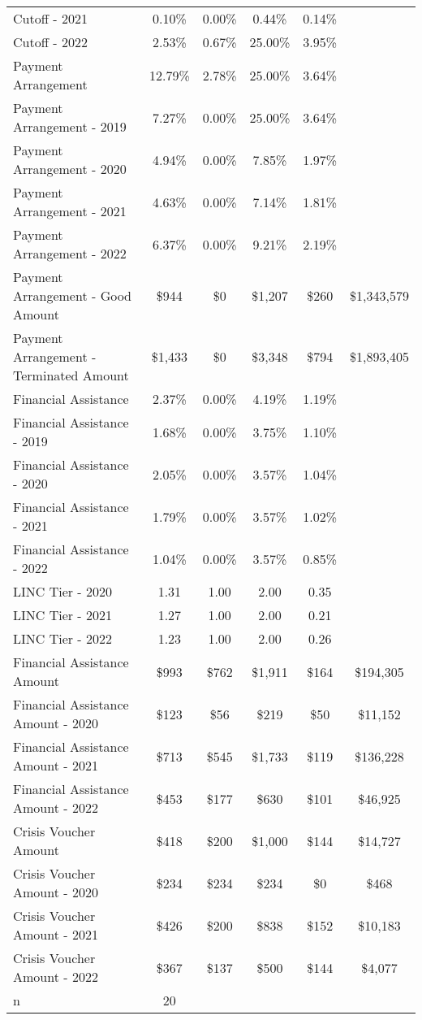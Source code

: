 \begin{tabular}{l|c|c|c|c|c}
\quad Cutoff - 2021 & 0.10\% & 0.00\% & 0.44\% & 0.14\% \\
\quad Cutoff - 2022 & 2.53\% & 0.67\% & 25.00\% & 3.95\% \\
\midrule 
Payment Arrangement & 12.79\% & 2.78\% & 25.00\% & 3.64\% \\
\quad Payment Arrangement - 2019 & 7.27\% & 0.00\% & 25.00\% & 3.64\% \\
\quad Payment Arrangement - 2020 & 4.94\% & 0.00\% & 7.85\% & 1.97\% \\
\quad Payment Arrangement - 2021 & 4.63\% & 0.00\% & 7.14\% & 1.81\% \\
\quad Payment Arrangement - 2022 & 6.37\% & 0.00\% & 9.21\% & 2.19\% \\
\quad Payment Arrangement - Good Amount & \$944 & \$0 & \$1,207 & \$260 & \$1,343,579 \\
\quad Payment Arrangement - Terminated Amount & \$1,433 & \$0 & \$3,348 & \$794 & \$1,893,405 \\
\midrule 
Financial Assistance & 2.37\% & 0.00\% & 4.19\% & 1.19\% \\
\quad Financial Assistance - 2019 & 1.68\% & 0.00\% & 3.75\% & 1.10\% \\
\quad Financial Assistance - 2020 & 2.05\% & 0.00\% & 3.57\% & 1.04\% \\
\quad Financial Assistance - 2021 & 1.79\% & 0.00\% & 3.57\% & 1.02\% \\
\quad Financial Assistance - 2022 & 1.04\% & 0.00\% & 3.57\% & 0.85\% \\
\midrule 
LINC Tier - 2020 & 1.31 & 1.00 & 2.00 & 0.35 \\
LINC Tier - 2021 & 1.27 & 1.00 & 2.00 & 0.21 \\
LINC Tier - 2022 & 1.23 & 1.00 & 2.00 & 0.26 \\
\midrule 
Financial Assistance Amount & \$993 & \$762 & \$1,911 & \$164 & \$194,305 \\
\quad Financial Assistance Amount - 2020 & \$123 & \$56 & \$219 & \$50 & \$11,152 \\
\quad Financial Assistance Amount - 2021 & \$713 & \$545 & \$1,733 & \$119 & \$136,228 \\
\quad Financial Assistance Amount - 2022 & \$453 & \$177 & \$630 & \$101 & \$46,925 \\
\midrule 
Crisis Voucher Amount & \$418 & \$200 & \$1,000 & \$144 & \$14,727 \\
\quad Crisis Voucher Amount - 2020 & \$234 & \$234 & \$234 & \$0 & \$468 \\
\quad Crisis Voucher Amount - 2021 & \$426 & \$200 & \$838 & \$152 & \$10,183 \\
\quad Crisis Voucher Amount - 2022 & \$367 & \$137 & \$500 & \$144 & \$4,077 \\
\midrule 
n & 20 &  &  &  &  \\
\midrule 
\bottomrule 
\end{tabular}
